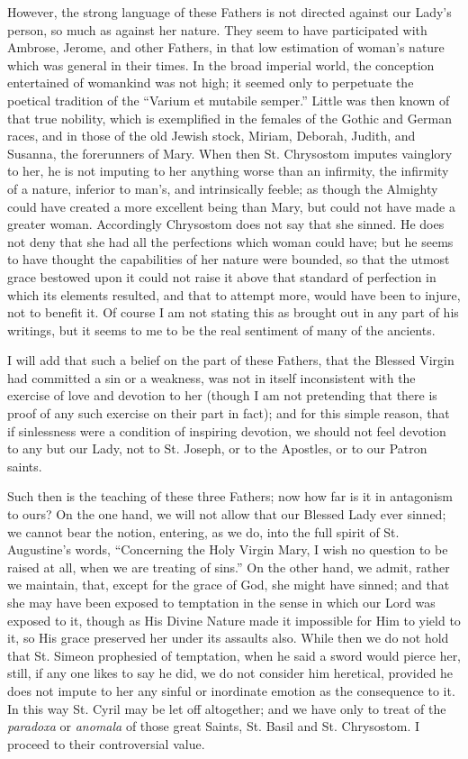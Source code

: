 However, the strong language of these Fathers is not directed against
our Lady's person, so much as against her nature. They seem to have
participated with Ambrose, Jerome, and other Fathers, in that low
estimation of woman's nature which was general in their times. In the
broad imperial world, the conception entertained of womankind was not
high; it seemed only to perpetuate the poetical tradition of the ``Varium
et mutabile semper.'' Little was then known of that true nobility,
which is exemplified in the females of the Gothic and German races, and
in those of the old Jewish stock, Miriam, Deborah, Judith, and Susanna,
the forerunners of Mary. When then St. Chrysostom imputes vainglory to
her, he is not imputing to her anything worse than an infirmity, the
infirmity of a nature, inferior to man's, and intrinsically feeble; as
though the Almighty could have created a more excellent being than Mary,
but could not have made a greater woman. Accordingly Chrysostom does not
say that she sinned. He does not deny that she had all the perfections
which woman could have; but he seems to have thought the
capabilities of her nature were bounded, so that the utmost grace
bestowed upon it could not raise it above that standard of perfection in
which its elements resulted, and that to attempt more, would have been
to injure, not to benefit it. Of course I am not stating this as brought
out in any part of his writings, but it seems to me to be the real
sentiment of many of the ancients.


I will add that such a belief on the part of these Fathers, that the
Blessed Virgin had committed a sin or a weakness, was not in itself
inconsistent with the exercise of love and devotion to her (though I am
not pretending that there is proof of any such exercise on their part in
fact); and for this simple reason, that if sinlessness were a condition
of inspiring devotion, we should not feel devotion to any but our Lady,
not to St. Joseph, or to the Apostles, or to our Patron saints.


Such then is the teaching of these three Fathers; now how far is it
in antagonism to ours? On the one hand, we will not allow that our
Blessed Lady ever sinned; we cannot bear the notion, entering, as we do,
into the full spirit of St. Augustine's words, ``Concerning the Holy
Virgin Mary, I wish no question to be raised at all, when we are
treating of sins.'' On the other hand, we admit, rather we maintain,
that, except for the grace of God, she might have sinned; and that she
may have been exposed to temptation in the sense in which our Lord was
exposed to it, though as His Divine Nature made it impossible for Him to
yield to it, so His grace preserved her under its assaults also. While
then we do not hold that St. Simeon prophesied of temptation, when
he said a sword would pierce her, still, if any one likes to say he did,
we do not consider him heretical, provided he does not impute to her any
sinful or inordinate emotion as the consequence to it. In this way St.
Cyril may be let off altogether; and we have only to treat of the \emph{paradoxa}
or \emph{anomala} of those great Saints, St. Basil and St. Chrysostom. I
proceed to their controversial value.



